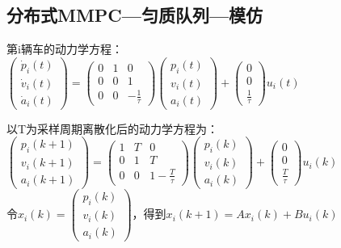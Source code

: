 \subsection {分布式MMPC—匀质队列—模仿}
第i辆车的动力学方程：
$\begin{pmatrix}
\dot{p} _{i}(t) \\
\dot{v} _{i} (t)\\
\dot{a} _{i}(t)
\end{pmatrix}=\begin{pmatrix}
 0 & 1 &0\\
 0 & 0 & 1\\
 0 & 0 &-\frac{1}{\tau }
\end{pmatrix}\begin{pmatrix}
p _{i}(t) \\
v _{i} (t)\\
a _{i}(t)
\end{pmatrix}+\begin{pmatrix}
0 \\
0\\
\frac{1}{\tau }
\end{pmatrix}u_{i}(t) $


以T为采样周期离散化后的动力学方程为：
$\begin{pmatrix}
p_{i}(k+1) \\
v_{i} (k+1)\\
a_{i}(k+1)
\end{pmatrix}=\begin{pmatrix}
 1 & T &0\\
 0 & 1 & T\\
 0 & 0 &1-\frac{T}{\tau }
\end{pmatrix}\begin{pmatrix}
p _{i}(k) \\
v _{i} (k)\\
a _{i}(k)
\end{pmatrix}+\begin{pmatrix}
0 \\
0\\
\frac{T}{\tau }
\end{pmatrix}u_{i}(k)$\\

令$x_{i}(k)=\begin{pmatrix}
p_{i}(k) \\
v_{i} (k)\\
a_{i}(k)
\end{pmatrix}$，得到$x_{i}(k+1)=Ax_{i}(k)+Bu_{i}(k)$


